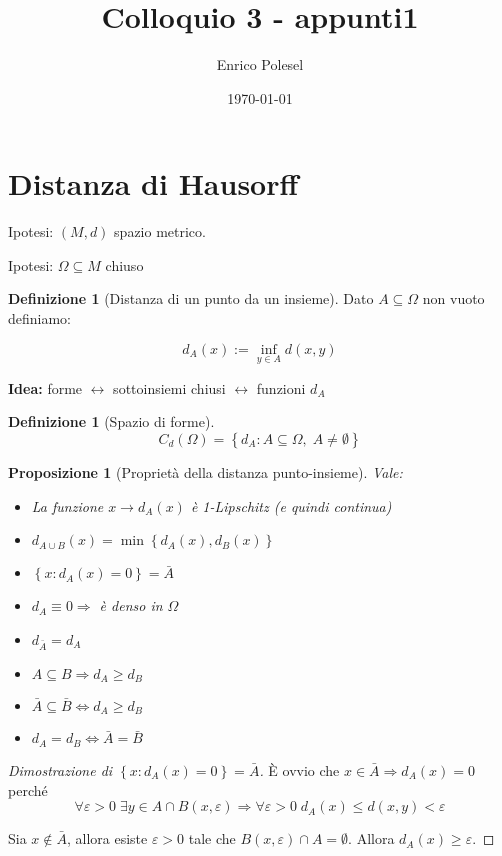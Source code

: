 \documentclass[a4paper,10pt]{article}
\title{Colloquio 3 - appunti1}
\author{Enrico Polesel}
\date{\today}
\newcounter{counter1}
\theoremstyle{plain}
\newtheorem{mypro}[counter1]{Proposizione}
\theoremstyle{definition}
\newtheorem{mydef}[counter1]{Definizione}
\theoremstyle{remark}
\newcommand{\set}[1]{\left\{#1\right\}}
\begin{document}
\maketitle

\section{Distanza di Hausorff}

Ipotesi: $(M,d)$ spazio metrico.

Ipotesi: $\Omega \subseteq M$ chiuso

\begin{mydef}[Distanza di un punto da un insieme]
Dato $A \subseteq \Omega$ non vuoto definiamo:

\[  d_A (x) := \inf _{y \in A} d(x,y) \] 
\end{mydef}

\textbf{Idea:} forme $\leftrightarrow$ sottoinsiemi chiusi
$\leftrightarrow$ funzioni $d_A$

\begin{mydef}[Spazio di forme]
  \[ C_d(\Omega) = \set{d_A : A \subseteq \Omega,\; A \neq \emptyset} \]
\end{mydef}

\begin{mypro}[Proprietà della distanza punto-insieme]
  Vale:
  \begin{itemize}
  \item La funzione $x \rightarrow d_A(x)$ è 1-Lipschitz (e quindi
    continua)
  \item $d_{A\cup B}(x) = \min\set{d_A(x),d_B(x)}$
  \item $\set{x:d_A(x) = 0} = \bar A$
  \item $d_A \equiv 0 \Rightarrow $ è denso in $\Omega$
  \item $d_{\bar A} = d_A$
  \item $A\subseteq B \Rightarrow d_A \ge d_B$
  \item $\bar A \subseteq \bar B \Leftrightarrow d_A \ge d_B$
  \item $d_A = d_B \Leftrightarrow \bar A = \bar B$
  \end{itemize}
\end{mypro}
\begin{proof} [Dimostrazione di $\set{x:d_A(x) = 0} = \bar A$]
  \`E ovvio che $x\in \bar A \Rightarrow d_A(x) = 0$ perché 
  \[ \forall \varepsilon > 0\; \exists y \in A \cap B(x,\varepsilon)
  \Rightarrow \forall \varepsilon > 0 \; d_A(x) \le d(x,y) <
  \varepsilon \]

  Sia $x\not\in \bar A$, allora esiste $\varepsilon>0$ tale che
  $B(x,\varepsilon) \cap A = \emptyset$. Allora $d_A(x) \ge
  \varepsilon$.
\end{proof}
\end{document}
